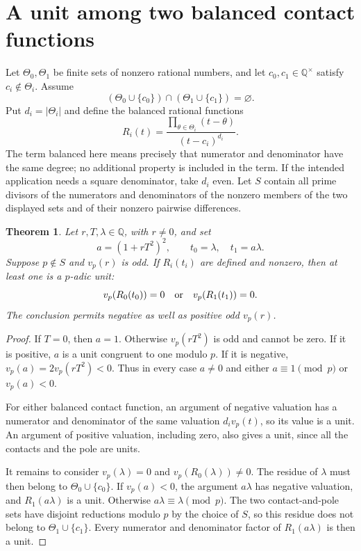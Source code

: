 \documentclass[11pt,a4paper]{article}
\newtheorem{theorem}{Theorem}[section]
\newcommand{\Q}{\mathbb Q}
\begin{document}
\section{A unit among two balanced contact functions}

Let $\Theta_0,\Theta_1$ be finite sets of nonzero rational numbers,
and let $c_0,c_1\in\Q^\times$ satisfy $c_i\notin\Theta_i$.
Assume
\[
       (\Theta_0\cup\{c_0\})\cap
       (\Theta_1\cup\{c_1\})=\varnothing.
\]
Put $d_i=|\Theta_i|$ and define the balanced rational functions
\[
                 R_i(t)=\frac{\prod_{\theta\in\Theta_i}(t-\theta)}
                                      {(t-c_i)^{d_i}}.
\]
The term balanced here means precisely that numerator and denominator
have the same degree; no additional property is included in the term.
If the intended application needs a square denominator, take $d_i$ even.
Let $S$ contain all prime divisors of the numerators and denominators
of the nonzero members of the two displayed sets and of their
nonzero pairwise differences.

\begin{theorem}\label{thm:unit}
Let $r,T,\lambda\in\Q$, with $r\ne0$, and set
\[
                  a=(1+rT^2)^2,\qquad t_0=\lambda,\quad t_1=a\lambda.
\]
Suppose $p\notin S$ and $v_p(r)$ is odd. If $R_i(t_i)$ are
defined and nonzero, then at least one is a $p$-adic unit:
\[
                       v_p(R_0(t_0))=0
                       \quad\hbox{or}\quad v_p(R_1(t_1))=0.
\]
The conclusion permits negative as well as positive odd $v_p(r)$.
\end{theorem}
\begin{proof}
If $T=0$, then $a=1$. Otherwise $v_p(rT^2)$ is odd and cannot
be zero. If it is positive, $a$ is a unit congruent to one modulo $p$.
If it is negative, $v_p(a)=2v_p(rT^2)<0$.
Thus in every case $a\ne0$ and either $a\equiv1\pmod p$ or
$v_p(a)<0$.

For either balanced contact function, an argument of negative valuation
has a numerator and denominator of the same valuation $d_i v_p(t)$,
so its value is a unit. An argument of positive valuation, including
zero, also gives a unit, since all the contacts and the pole are units.

It remains to consider $v_p(\lambda)=0$ and
$v_p(R_0(\lambda))\ne0$. The residue of $\lambda$ must then belong to
$\Theta_0\cup\{c_0\}$. If $v_p(a)<0$, the argument $a\lambda$ has
negative valuation, and $R_1(a\lambda)$ is a unit. Otherwise
$a\lambda\equiv\lambda\pmod p$. The two contact-and-pole sets have
disjoint reductions modulo $p$ by the choice of $S$, so this residue
does not belong to $\Theta_1\cup\{c_1\}$. Every numerator and denominator
factor of $R_1(a\lambda)$ is then a unit.
\end{proof}
\end{document}

